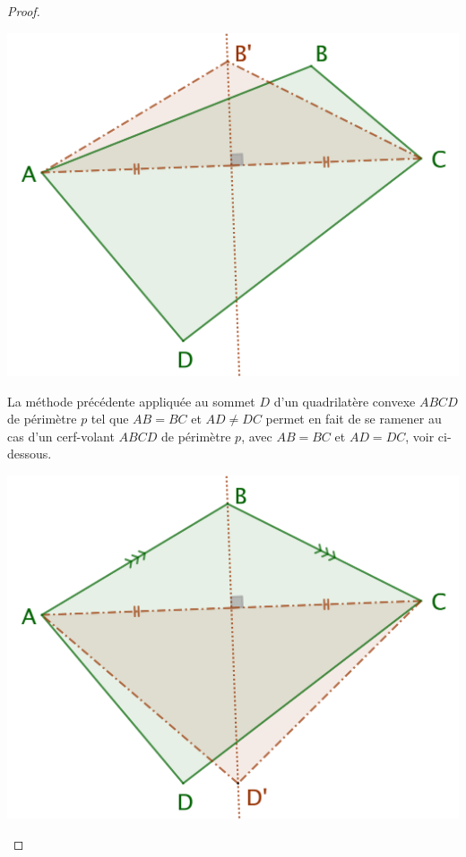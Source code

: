 \begin{proof}
	\begin{center}
		\includegraphics[scale=.4]{content/quadrilateral/quadrilateral-convex-gene.png}
	\end{center}
	
	
	La méthode précédente appliquée au sommet $D$ d'un quadrilatère convexe $ABCD$ de périmètre $p$ tel que $AB = BC$ et $AD \neq DC$ permet en fait de se ramener au cas d'un cerf-volant $ABCD$ de périmètre $p$, avec $AB = BC$ et $AD = DC$, voir ci-dessous. 

	\begin{center}
		\includegraphics[scale=.4]{content/quadrilateral/quadrilateral-convex-one-paire.png}
	\end{center}
	

\end{proof}
